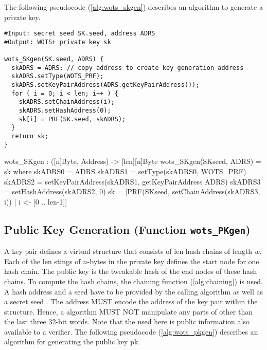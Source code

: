 The following pseudocode (\autoref{alg:wots_skgen}) describes an algorithm 
to generate a \wotsp private key.

\begin{lstlisting}[label=alg:wots_skgen, language=pseudoc,
                   caption=\texttt{wots\_SKgen} -- Generating a \wotsp private key.]
#Input: secret seed SK.seed, address ADRS
#Output: WOTS+ private key sk

wots_SKgen(SK.seed, ADRS) {
  skADRS = ADRS; // copy address to create key generation address
  skADRS.setType(WOTS_PRF);
  skADRS.setKeyPairAddress(ADRS.getKeyPairAddress());
  for ( i = 0; i < len; i++ ) {
    skADRS.setChainAddress(i);
    skADRS.setHashAddress(0);
    sk[i] = PRF(SK.seed, skADRS);
  }
  return sk;
}
\end{lstlisting}

\begin{code}
  wots_SKgen : ([n]Byte, Address) -> [len][n]Byte
  wots_SKgen(SKseed, ADRS) = sk where
    skADRS0 = ADRS
    skADRS1 = setType(skADRS0, WOTS_PRF)
    skADRS2 = setKeyPairAddress(skADRS1, getKeyPairAddress ADRS)
    skADRS3 = setHashAddress(skADRS2, 0)
    sk = [PRF(SKseed, setChainAddress(skADRS3, i)) | i <- [0 .. len-1]]
\end{code}

\subsection{\wotsp Public Key Generation (Function \texttt{wots\_PKgen})}
A \wotsp key pair defines a virtual structure that consists of len hash chains of
length $w$. 
Each of the len stings of $n$-bytes in the private key defines the start
node for one hash chain. The public key is the tweakable hash of the end nodes 
of these hash chains. 
To compute the hash chains, the chaining function
(\autoref{alg:chaining}) is used. A \wotsp hash address \adrs and a seed \pseed have
to be provided by the calling algorithm as well as a secret seed \sseed. 
The address \adrs MUST encode the address of
the \wotsp key pair within the \spx structure. Hence, a \wotsp algorithm MUST NOT
manipulate any parts of \adrs other than the last three $32$-bit words. 
Note that the \pseed used here is public information also available to a verifier.
The following pseudocode (\autoref{alg:wots_pkgen}) describes an algorithm for
generating the public key pk.


